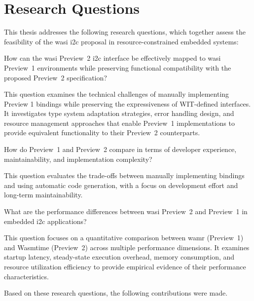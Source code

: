 \section{Research Questions}
\label{sec:research-questions}

This thesis addresses the following research questions, which together assess the feasibility of the \acrshort{wasi} \acrshort{i2c} proposal in resource-constrained embedded systems:

\begin{researchquestion}\label{rq1}
How can the \acrshort{wasi} Preview~2 \acrshort{i2c} interface be effectively mapped to \acrshort{wasi} Preview~1 environments while preserving functional compatibility with the proposed Preview~2 specification?
\end{researchquestion}

This question examines the technical challenges of manually implementing Preview 1 bindings while preserving the expressiveness of WIT-defined interfaces. It investigates type system adaptation strategies, error handling design, and resource management approaches that enable Preview~1 implementations to provide equivalent functionality to their Preview~2 counterparts.

\begin{researchquestion}\label{rq2}
How do Preview~1 and Preview~2 compare in terms of developer experience, maintainability, and implementation complexity?
\end{researchquestion}

This question evaluates the trade-offs between manually implementing bindings and using automatic code generation, with a focus on development effort and long-term maintainability.

\begin{researchquestion}\label{rq3}
What are the performance differences between \acrshort{wasi} Preview~2 and Preview~1 in embedded \acrshort{i2c} applications?
\end{researchquestion}

This question focuses on a quantitative comparison between \acrshort{wamr} (Preview~1) and Wasmtime (Preview~2) across multiple performance dimensions. It examines startup latency, steady-state execution overhead, memory consumption, and resource utilization efficiency to provide empirical evidence of their performance characteristics.

Based on these research questions, the following contributions were made.






